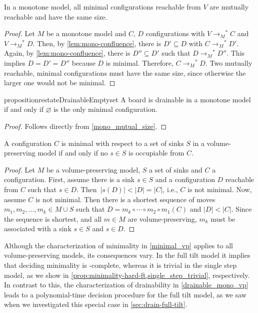 \documentclass[a4paper,UKenglish,cleveref,thm-restate]{lipics-v2021}
\newcommand{\rOne}[1][M]{\ensuremath{\rightarrow_{#1}}}
\newcommand{\rStar}[1][M]{\rOne[#1]^*}
\newcommand{\mSeq}[1][k]{\ensuremath{m_1,m_2,\ldots,m_{#1}}}
\newcommand{\mComp}[1][k]{\ensuremath{m_{#1}\circ\cdots\circ m_2 \circ m_1}}
\begin{document}
\begin{proposition}
    \label{mono_mutual_size}
    In a monotone model, all minimal configurations reachable from $V$ are mutually
    reachable and have the same size.
\end{proposition}
\begin{proof}
    Let $M$ be a monotone model and $C$, $D$ configurations with $V \rStar C$ and
    $V \rStar D$. Then, by \cref{lem:mono-confluence}, there is $D' \subseteq D$ with
    $C \rStar D'$. Again, by \cref{lem:mono-confluence}, there is $D'' \subseteq D'$
    such that $D \rStar D''$. This implies $D = D' = D''$ because $D$ is
    minimal. Therefore, $C \rStar D$. Two mutually reachable, minimal configurations
    must have the same size, since otherwise the larger one would not be minimal.
\end{proof}

\begin{restatable}{proposition}{restateDrainableEmptyset}\label{drainable_emptyset}
A board is drainable in a monotone model if and only if $\varnothing$ is the
only minimal configuration.
\end{restatable}
\begin{proof}
    Follows directly from \cref{mono_mutual_size}.
\end{proof}

\begin{lemma}\label{minimal_vp}
A configuration $C$ is minimal with respect to a set of sinks $S$ in a
volume-preserving model if and only if no $s \in S$ is occupiable from $C$.
\end{lemma}
\begin{proof}
Let $M$ be a volume-preserving model, $S$ a set of sinks and $C$ a
configuration. First, assume there is a sink $s \in S$ and a configuration $D$
reachable from $C$ such that $s \in D$. Then~\(|s(D)| < |D| = |C|\), i.e., $C$
is not minimal. Now, assume $C$ is not minimal. Then there is a shortest
sequence of moves $\mSeq \in M \cup S$ such that $D = \mComp(C)$ and \(|D| <
|C|\). Since the sequence is shortest, and all $m \in M$ are volume-preserving,
$m_k$ must be associated with a sink $s \in S$ and $s \in D$.
\end{proof}

Although the characterization of minimality in \cref{minimal_vp} applies to all
volume-preserving models, its consequences vary. In the full tilt model it
implies that deciding minimality is \PSPACE-complete, whereas it is trivial in
the single step model, as we show in
\cref{prop:minimality-hard-ft,single_step_trivial}, respectively. In contrast to
this, the characterization of drainability in \cref{drainable_mono_vp} leads to a
polynomial-time decision procedure for the full tilt model, as we saw when
we investigated this special case in \cref{sec:drain-full-tilt}.
\end{document}
